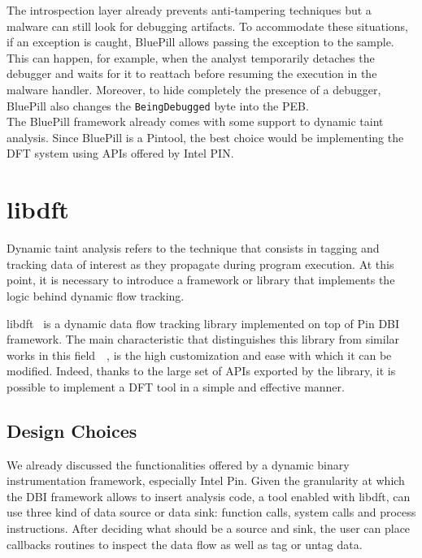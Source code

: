 \documentclass[LaM,binding=0.6cm]{sapthesis}
\begin{document}
The introspection layer already prevents anti-tampering techniques but a malware can still look for debugging artifacts. To accommodate these situations, if an exception is caught, BluePill allows passing the exception to the sample. This can happen, for example, when the analyst temporarily detaches the debugger and waits for it to reattach before resuming the execution in the malware handler. Moreover, to hide completely the presence of a debugger, BluePill also changes the \texttt{BeingDebugged} byte into the PEB.\\

The BluePill framework already comes with some support to dynamic taint analysis. Since BluePill is a Pintool, the best choice would be implementing the DFT system using APIs offered by Intel PIN.

\section{libdft}
Dynamic taint analysis refers to the technique that consists in tagging and tracking data of interest as they propagate during program execution. At this point, it is necessary to introduce a framework or library that implements the logic behind dynamic flow tracking.

libdft~\cite{kemerlis2012libdft} is a dynamic data flow tracking library implemented on top of Pin DBI framework. The main characteristic that distinguishes this library from similar works in this field~\cite{bosman2011minemu}~\cite{qin2006lift}, is the high customization and ease with which it can be modified. Indeed, thanks to the large set of APIs exported by the library, it is possible to implement a DFT tool in a simple and effective manner.

\subsection{Design Choices}
We already discussed the functionalities offered by a dynamic binary instrumentation framework, especially Intel Pin. Given the granularity at which the DBI framework allows to insert analysis code, a tool enabled with libdft, can use three kind of data source or data sink: function calls, system calls and process instructions. After deciding what should be a source and sink, the user can place callbacks routines to inspect the data flow as well as tag or untag data.
\end{document}
